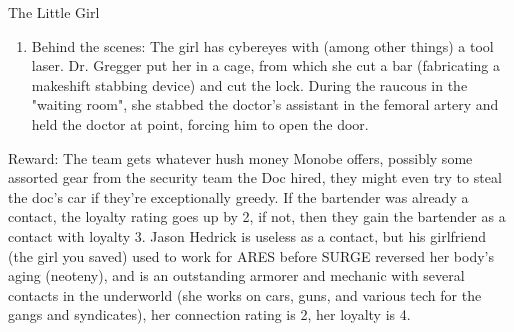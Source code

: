\begin{scenario}{The Little Girl}
\begin{enumerate}
\item Behind the scenes: The girl has cybereyes with (among other things) a tool laser. Dr. Gregger put her in a cage, from which she cut a bar (fabricating a makeshift stabbing device) and cut the lock. During the raucous in the "waiting room", she stabbed the doctor's assistant in the femoral artery and held the doctor at point, forcing him to open the door.

\end{enumerate}

Reward: The team gets whatever hush money Monobe offers, possibly some assorted gear from the security team the Doc hired, they might even try to steal the doc's car if they're exceptionally greedy. If the bartender was already a contact, the loyalty rating goes up by 2, if not, then they gain the bartender as a contact with loyalty 3. Jason Hedrick is useless as a contact, but his girlfriend (the girl you saved) used to work for ARES before SURGE reversed her body's aging (neoteny), and is an outstanding armorer and mechanic with several contacts in the underworld (she works on cars, guns, and various tech for the gangs and syndicates), her connection rating is 2, her loyalty is 4. 

\end{scenario}
